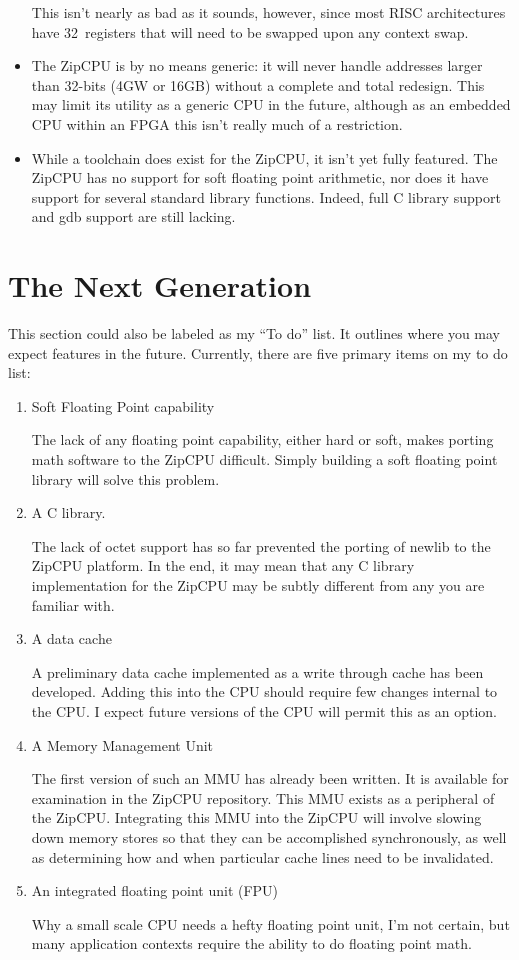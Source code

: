 \documentclass{gqtekspec}
\begin{document}
\begin{itemize}
	This isn't nearly as bad as it sounds, however, since most RISC
	architectures have 32~registers that will need to be swapped upon any
	context swap.

\item The ZipCPU is by no means generic: it will never handle addresses
	larger than 32-bits (4GW or 16GB) without a complete and total redesign.
	This may limit its utility as a generic CPU in the future, although
	as an embedded CPU within an FPGA this isn't really much of a
	restriction.

\item While a toolchain does exist for the ZipCPU, it isn't yet fully featured.
	The ZipCPU has no support for soft floating point arithmetic,
	nor does it have support for several standard library functions.
	Indeed, full C library support and gdb support are still lacking.
\end{itemize}

\section{The Next Generation}
This section could also be labeled as my ``To do'' list.  It outlines where
you may expect features in the future.  Currently, there are five primary
items on my to do list:
\begin{enumerate}
\item Soft Floating Point capability

	The lack of any floating point capability, either hard or soft, makes
	porting math software to the ZipCPU difficult.  Simply building a 
	soft floating point library will solve this problem.

\item A C library.

	The lack of octet support has so far prevented the porting of 
	newlib to the ZipCPU platform.  In the end, it may mean that any
	C library implementation for the ZipCPU may be subtly different
	from any you are familiar with.

\item A data cache

	A preliminary data cache implemented as a write through cache has
	been developed.  Adding this into the CPU should require few changes
	internal to the CPU.  I expect future versions of the CPU will permit
	this as an option.

\item A Memory Management Unit

	The first version of such an MMU has already been written.  It is 
	available for examination in the ZipCPU repository.  This MMU exists
	as a peripheral of the ZipCPU.  Integrating this MMU into the ZipCPU
	will involve slowing down memory stores so that they can be accomplished
	synchronously, as well as determining how and when particular cache
	lines need to be invalidated.

\item An integrated floating point unit (FPU)

	Why a small scale CPU needs a hefty floating point unit, I'm not
	certain, but many application contexts require the ability to do
	floating point math.
\end{enumerate}
\end{document}
